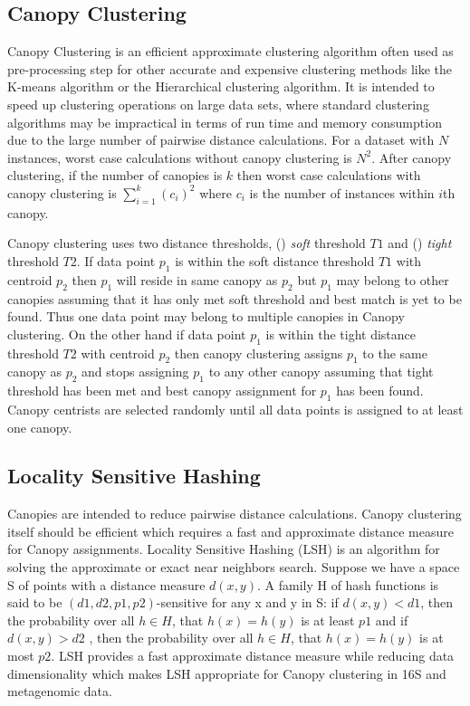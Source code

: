 \documentclass[10pt, conference, compsocconf]{IEEEtran}
\begin{document}
\subsection{\textbf{Canopy Clustering}}

Canopy Clustering \cite{MARCanopy} is an efficient approximate clustering algorithm often used as pre-processing step for other accurate and expensive clustering methods like the K-means algorithm or the Hierarchical clustering algorithm. It is intended to speed up clustering operations on large data sets, where standard clustering algorithms may be impractical in terms of run time and memory consumption due to the large number of pairwise distance calculations. For a dataset with $N$ instances, worst case calculations without canopy clustering is $N^2$. After canopy clustering, if the number of canopies is $k$ then worst case calculations with canopy clustering is $\sum_{i=1}^{k}(c_i)^2$ where $c_i$ is the number of instances within $i$th canopy.

Canopy clustering uses two distance thresholds, () \textit{soft} threshold $T1$ and () \textit{tight} threshold $T2$. If data point $p_1$ is within the soft distance threshold $T1$ with centroid $p_2$ then $p_1$ will reside in same canopy as $p_2$ but $p_1$ may belong to other canopies assuming that it has only met soft threshold and best match is yet to be found. Thus one data point may belong to multiple canopies in Canopy clustering. On the other hand if data point $p_1$ is within the tight distance threshold $T2$ with centroid $p_2$ then canopy clustering assigns $p_1$ to the same canopy as $p_2$ and stops assigning $p_1$ to any other canopy assuming that tight threshold has been met and best canopy assignment for $p_1$ has been found. Canopy centrists are selected randomly until all data points is assigned to at least one canopy. 


\subsection{\textbf{Locality Sensitive Hashing}}

Canopies are intended to reduce pairwise distance calculations. Canopy clustering itself should be efficient which requires a fast and approximate distance measure for Canopy assignments. Locality Sensitive Hashing (LSH) \cite{MARLshRef2} is an algorithm for solving the approximate or exact near neighbors search. Suppose we have a space S of points with a distance measure $d(x,y)$. A family H of hash functions is said to be $(d1, d2, p1, p2)$-sensitive for any x and y in S: if $d(x, y)<d1$, then the probability over all $h\in{H}$, that $h(x)=h(y)$ is at least $p1$ and if $d(x, y)>d2$ , then the probability over all $h\in{H}$, that $h(x)=h(y)$ is at most $p2$. LSH provides a fast approximate distance measure while reducing data dimensionality which makes LSH appropriate for Canopy clustering in 16S and metagenomic data.
\end{document}
